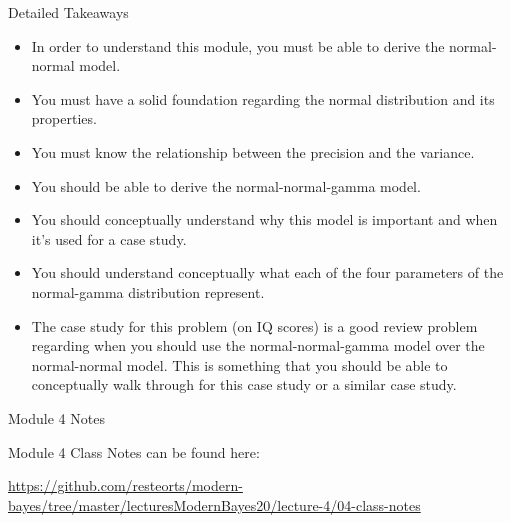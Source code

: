 \documentclass[
  ignorenonframetext,
]{beamer}
\providecommand{\tightlist}{%
  \setlength{\itemsep}{0pt}\setlength{\parskip}{0pt}}
\begin{document}
\begin{frame}{Detailed Takeaways}
\protect\hypertarget{detailed-takeaways}{}

\begin{itemize}
\tightlist
\item
  In order to understand this module, you must be able to derive the
  normal-normal model.
\item
  You must have a solid foundation regarding the normal distribution and
  its properties.
\item
  You must know the relationship between the precision and the variance.
\item
  You should be able to derive the normal-normal-gamma model.
\item
  You should conceptually understand why this model is important and
  when it's used for a case study.
\item
  You should understand conceptually what each of the four parameters of
  the normal-gamma distribution represent.
\item
  The case study for this problem (on IQ scores) is a good review
  problem regarding when you should use the normal-normal-gamma model
  over the normal-normal model. This is something that you should be
  able to conceptually walk through for this case study or a similar
  case study.
\end{itemize}

\end{frame}

\begin{frame}{Module 4 Notes}
\protect\hypertarget{module-4-notes}{}

Module 4 Class Notes can be found here:

\url{https://github.com/resteorts/modern-bayes/tree/master/lecturesModernBayes20/lecture-4/04-class-notes}

\end{frame}
\end{document}
